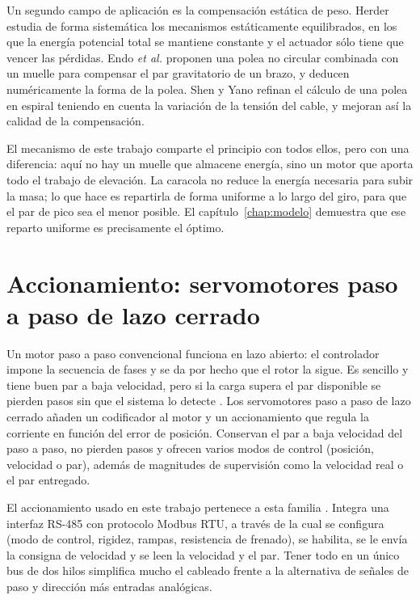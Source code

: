 Un segundo campo de aplicación es la compensación estática de peso. Herder \cite{herder2001}
estudia de forma sistemática los mecanismos estáticamente equilibrados, en los que la energía
potencial total se mantiene constante y el actuador sólo tiene que vencer las pérdidas. Endo
\emph{et al.} \cite{endo2010} proponen una polea no circular combinada con un muelle para
compensar el par gravitatorio de un brazo, y deducen numéricamente la forma de la polea. Shen y
Yano \cite{shen2022} refinan el cálculo de una polea en espiral teniendo en cuenta la variación de
la tensión del cable, y mejoran así la calidad de la compensación.

El mecanismo de este trabajo comparte el principio con todos ellos, pero con una diferencia: aquí
no hay un muelle que almacene energía, sino un motor que aporta todo el trabajo de elevación. La
caracola no reduce la energía necesaria para subir la masa; lo que hace es repartirla de forma
uniforme a lo largo del giro, para que el par de pico sea el menor posible. El
capítulo~\ref{chap:modelo} demuestra que ese reparto uniforme es precisamente el óptimo.

\section{Accionamiento: servomotores paso a paso de lazo cerrado}

Un motor paso a paso convencional funciona en lazo abierto: el controlador impone la secuencia de
fases y se da por hecho que el rotor la sigue. Es sencillo y tiene buen par a baja velocidad, pero
si la carga supera el par disponible se pierden pasos sin que el sistema lo detecte
\cite{kenjo1994}. Los servomotores paso a paso de lazo cerrado añaden un codificador al motor y un
accionamiento que regula la corriente en función del error de posición. Conservan el par a baja
velocidad del paso a paso, no pierden pasos y ofrecen varios modos de control (posición, velocidad
o par), además de magnitudes de supervisión como la velocidad real o el par entregado.

El accionamiento usado en este trabajo pertenece a esta familia
. Integra una interfaz RS-485 con protocolo Modbus RTU, a través de la
cual se configura (modo de control, rigidez, rampas, resistencia de frenado), se habilita, se le
envía la consigna de velocidad y se leen la velocidad y el par. Tener todo en un único bus de dos
hilos simplifica mucho el cableado frente a la alternativa de señales de paso y dirección más
entradas analógicas.

